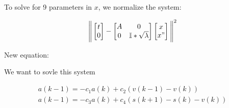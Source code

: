 \documentclass[10pt]{article}         %
\begin{document}
To solve for 9 parameters in $x$, we normalize the system:
 
\begin{equation}
\Bigg\| 
    \begin{bmatrix}
    t \\ 0
    \end{bmatrix}
    -
    \begin{bmatrix}
    A & 0\\ 
    0 & \mathbb{I} * \sqrt{\lambda}
    \end{bmatrix}
    \begin{bmatrix}
    x \\
    x"
    \end{bmatrix}
\Bigg\| ^2
\end{equation}

New equation:

We want to sovle this system


\begin{align}
a(k-1) = - c_1 a(k)  + c_2 (v(k-1) - v(k))  \\
a(k-1) = - c_3 a(k)  + c_4 (s(k+1) - s(k) - v(k))
\end{align}





%
\end{document}

